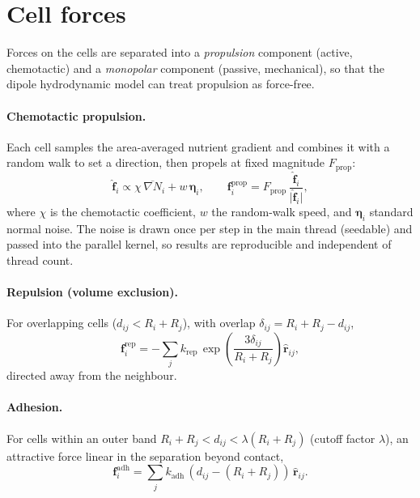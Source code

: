 \documentclass[11pt]{article}
\newcommand{\vf}{\bm{f}}
\newcommand{\vr}{\bm{r}}
\newcommand{\grad}{\nabla}
\begin{document}
\section{Cell forces}\label{sec:forces}

Forces on the cells are separated into a \emph{propulsion} component (active,
chemotactic) and a \emph{monopolar} component (passive, mechanical), so that
the dipole hydrodynamic model can treat propulsion as force-free.

\paragraph{Chemotactic propulsion.} Each cell samples the area-averaged nutrient
gradient and combines it with a random walk to set a direction, then propels at
fixed magnitude $F_{\text{prop}}$:
\begin{equation}
  \hat{\vf}_i \propto \chi\,\overline{\grad N}_i + w\,\bm{\eta}_i, \qquad
  \vf^{\text{prop}}_i = F_{\text{prop}}\,\frac{\hat{\vf}_i}{\lvert\hat{\vf}_i\rvert},
\end{equation}
where $\chi$ is the chemotactic coefficient, $w$ the random-walk speed, and
$\bm{\eta}_i$ standard normal noise. The noise is drawn once per step in the main
thread (seedable) and passed into the parallel kernel, so results are
reproducible and independent of thread count.

\paragraph{Repulsion (volume exclusion).} For overlapping cells
($d_{ij} < R_i + R_j$), with overlap $\delta_{ij}=R_i+R_j-d_{ij}$,
\begin{equation}
  \vf^{\text{rep}}_i = -\sum_{j} k_{\text{rep}}\,
  \exp\!\left(\frac{3\delta_{ij}}{R_i+R_j}\right)\hat{\vr}_{ij},
\end{equation}
directed away from the neighbour.

\paragraph{Adhesion.} For cells within an outer band
$R_i+R_j < d_{ij} < \lambda(R_i+R_j)$ (cutoff factor $\lambda$), an attractive
force linear in the separation beyond contact,
\begin{equation}
  \vf^{\text{adh}}_i = \sum_j k_{\text{adh}}\,(d_{ij}-(R_i+R_j))\,\hat{\vr}_{ij}.
\end{equation}
\end{document}
